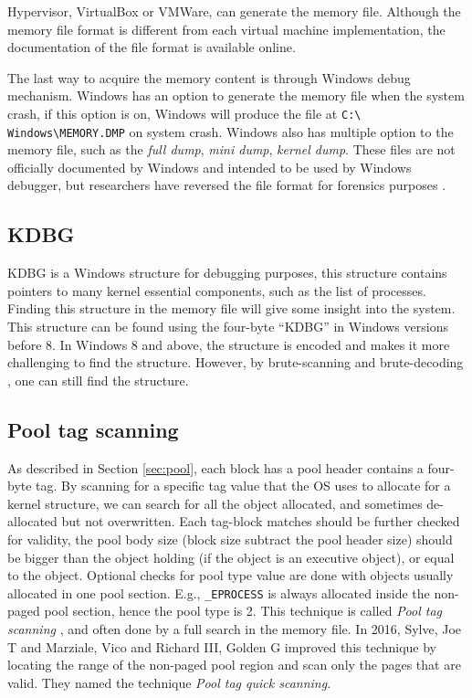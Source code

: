 Hypervisor, VirtualBox or VMWare, can generate the memory file.  Although the
memory file format is different from each virtual machine implementation, the
documentation of the file format is available online.

The last way to acquire the memory content is through Windows debug mechanism.
Windows has an option to generate the memory file when the system crash, if
this option is on, Windows will produce the file at \texttt{C:\textbackslash
Windows\textbackslash MEMORY.DMP} on system crash. Windows also has multiple
option to the memory file, such as the \textit{full dump}, \textit{mini dump},
\textit{kernel dump}. These files are not officially documented by Windows and
intended to be used by Windows debugger, but researchers have reversed the file
format for forensics purposes \cite{mdmpfile} \cite{dmpfile}.

\subsection[KDBG]{KDBG}

KDBG is a Windows structure for debugging purposes, this structure contains
pointers to many kernel essential components, such as the list of processes.
Finding this structure in the memory file will give some insight into the
system.  This structure can be found using the four-byte ``KDBG'' in Windows
versions before 8. In Windows 8 and above, the structure is encoded and makes
it more challenging to find the structure. However, by brute-scanning and
brute-decoding \cite{kdbgEncoded}, one can still find the structure.

\subsection[Pool tag scanning]{Pool tag scanning}

As described in Section \ref{sec:pool}, each block has a pool header contains a
four-byte tag. By scanning for a specific tag value that the OS uses to
allocate for a kernel structure, we can search for all the object allocated,
and sometimes de-allocated but not overwritten. Each tag-block matches should
be further checked for validity, the pool body size (block size subtract the
pool header size) should be bigger than the object holding (if the object is an
executive object), or equal to the object.  Optional checks for pool type value
are done with objects usually allocated in one pool section.  E.g.,
\texttt{\_EPROCESS} is always allocated inside the non-paged pool section,
hence the pool type is 2. This technique is called \textit{Pool tag scanning}
\cite{pooltagscan}, and often done by a full search in the memory file. In
2016, Sylve, Joe T and Marziale, Vico and Richard III, Golden G
\cite{sylve2016pool} improved this technique by locating the range of the
non-paged pool region and scan only the pages that are valid. They named the
technique \textit{Pool tag quick scanning}.

